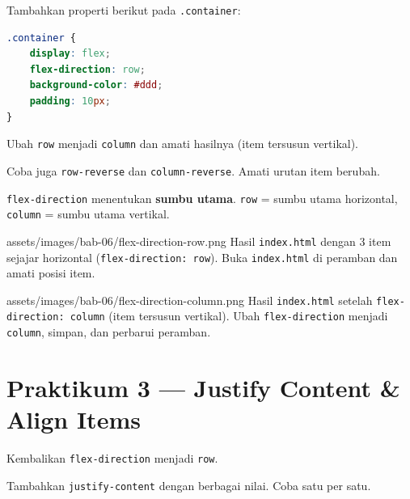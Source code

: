 \begin{langkah}
  \item Tambahkan properti berikut pada \texttt{.container}:
\end{langkah}

\begin{lstlisting}[language=CSS, caption={flex-direction: row (default)}, label={lst:flex-direction}]
.container {
    display: flex;
    flex-direction: row;
    background-color: #ddd;
    padding: 10px;
}
\end{lstlisting}

\begin{langkah}
  \item Ubah \texttt{row} menjadi \texttt{column} dan amati hasilnya (item tersusun vertikal).
  \item Coba juga \texttt{row-reverse} dan \texttt{column-reverse}. Amati urutan item berubah.
\end{langkah}

\begin{catatan}
\texttt{flex-direction} menentukan \textbf{sumbu utama}. \texttt{row} = sumbu utama horizontal, \texttt{column} = sumbu utama vertikal.
\end{catatan}

\begin{tangkapanlayar}
  {assets/images/bab-06/flex-direction-row.png}
  {Hasil \texttt{index.html} dengan 3 item sejajar horizontal (\texttt{flex-direction: row}).}
  {Buka \texttt{index.html} di peramban dan amati posisi item.}
\end{tangkapanlayar}

\begin{tangkapanlayar}
  {assets/images/bab-06/flex-direction-column.png}
  {Hasil \texttt{index.html} setelah \texttt{flex-direction: column} (item tersusun vertikal).}
  {Ubah \texttt{flex-direction} menjadi \texttt{column}, simpan, dan perbarui peramban.}
\end{tangkapanlayar}

\section{Praktikum 3 --- Justify Content \& Align Items}
\label{sec:flex-praktik-3}

\begin{langkah}
  \item Kembalikan \texttt{flex-direction} menjadi \texttt{row}.
  \item Tambahkan \texttt{justify-content} dengan berbagai nilai. Coba satu per satu.
\end{langkah}

